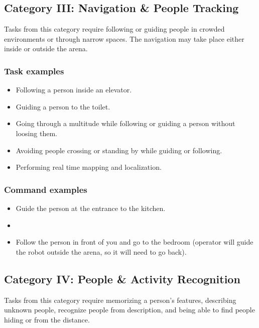 %
%
\subsection{Category III: Navigation \& People Tracking}
\label{sec:eegpsr-category3-explained}
Tasks from this category require following or guiding people in crowded environments or through narrow spaces. The navigation may take place either inside or outside the arena.

\subsubsection{Task examples}
\begin{itemize}
	\item Following a person inside an elevator.
	\item Guiding a person to the toilet.
	\item Going through a multitude while following or guiding a person without loosing them.
	\item Avoiding people crossing or standing by while guiding or following.
	\item Performing real time mapping and localization.
\end{itemize}

\subsubsection{Command examples}
\begin{itemize}
	\item Guide the person at the entrance to the kitchen.
	\item 
	\item Follow the person in front of you and go to the bedroom (operator will guide the robot outside the arena, so it will need to go back). 
\end{itemize}


%
%
\subsection{Category IV: People \& Activity Recognition}
\label{sec:eegpsr-category4-explained}
Tasks from this category require memorizing a person's features, describing unknown people, recognize people from description, and being able to find people hiding or from the distance.

